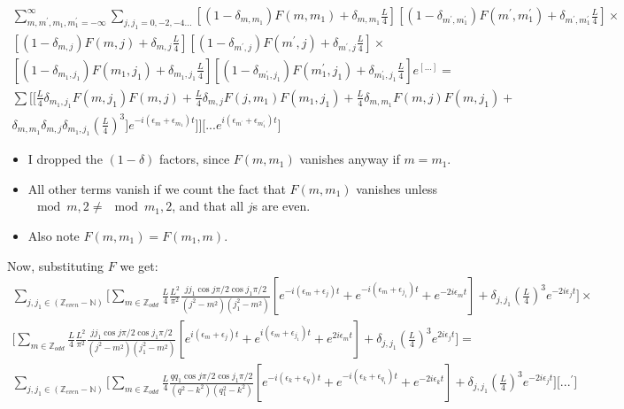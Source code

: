 \documentclass[a4paper]{article}
\begin{document}
\begin{gather*}
\sum_{m, m^\prime, m_1, m_1^\prime = -\infty}^\infty \sum_{j, j_1  = 0, -2, -4 ...} 
[(1 - \delta_{m, m_1})F(m, m_1) + \delta_{m, m_1} \frac{L}{4}] 
[(1 - \delta_{m^\prime, m^\prime_1})F(m^\prime, m^\prime_1) + \delta_{m^\prime, m^\prime_1} \frac{L}{4}] \times \\
[(1 - \delta_{m, j})F(m, j) + \delta_{m, j} \frac{L}{4}]
[(1 - \delta_{m^\prime, j})F(m^\prime, j) + \delta_{m^\prime, j} \frac{L}{4}] \times \\
[(1 - \delta_{m_1, j_1})F(m_1, j_1) + \delta_{m_1, j_1} \frac{L}{4}]
[(1 - \delta_{m^\prime_1, j_1})F(m^\prime_1, j_1) + \delta_{m^\prime_1, j_1} \frac{L}{4}] e^{[\dots]} = \\
\sum \big[[\frac{L}{4} \delta_{m_1, j_1}F(m, j_1)F(m, j) + \frac{L}{4} \delta_{m, j}F(j, m_1)F(m_1, j_1) + \frac{L}{4} \delta_{m, m_1}F(m, j)F(m, j_1) + \\
\delta_{m, m_1}\delta_{m, j}\delta_{m_1, j_1}(\frac{L}{4})^3]e^{-i(\epsilon_m + \epsilon_{m_1})t}]\big] \big[ ... e^{i(\epsilon_{m^\prime} + \epsilon_{m_1^\prime})t}\big]
\end{gather*}
\begin{itemize}
	\item I dropped the $(1 - \delta)$ factors, since $F(m, m_1)$ vanishes anyway if $m = m_1$.
	\item All other terms vanish if we count the fact that $F(m, m_1)$ vanishes unless $\mod{m ,2} \ne \mod{m_1, 2}$, and that all $j$s are even.
	\item Also note $F(m, m_1) = F(m_1, m)$.
\end{itemize}

Now, substituting $F$ we get:
\begin{gather*}
\sum_{j, j_1 \in (\mathbb{Z}_{even} - \mathbb{N})}
\big[ \sum_{m \in \mathbb{Z}_{odd}} \frac{L}{4}\frac{L^2}{\pi^2} \frac{jj_1\cos{j\pi/2}\cos{j_1\pi/2}}{(j^2 - m^2)(j_1^2 - m^2)}[e^{-i(\epsilon_m + \epsilon_j)t} + e^{-i(\epsilon_m + \epsilon_{j_1})t} + e^{-2i\epsilon_m t}] 
+ \delta_{j, j_1}(\frac{L}{4})^3 e^{-2i\epsilon_j t} 
\big] \times \\
 \big[\sum_{m \in \mathbb{Z}_{odd}} \frac{L}{4}\frac{L^2}{\pi^2} \frac{jj_1\cos{j\pi/2}\cos{j_1\pi/2}}{(j^2 - m^2)(j_1^2 - m^2)}[e^{i(\epsilon_m + \epsilon_j)t} + e^{i(\epsilon_m + \epsilon_{j_1})t} + e^{2i\epsilon_m t}] 
+ \delta_{j, j_1}(\frac{L}{4})^3 e^{2i\epsilon_j t} \big] = \\
\sum_{j, j_1 \in (\mathbb{Z}_{even} - \mathbb{N})}
\big[ \sum_{m \in \mathbb{Z}_{odd}} \frac{L}{4} \frac{qq_1\cos{j\pi/2}\cos{j_1\pi/2}}{(q^2 - k^2)(q_1^2 - k^2)}[e^{-i(\epsilon_k + \epsilon_q)t} + e^{-i(\epsilon_k + \epsilon_{q_1})t} + e^{-2i\epsilon_k t}] 
+ \delta_{j, j_1}(\frac{L}{4})^3 e^{-2i\epsilon_j t} 
\big] \big[...^\prime\big]
\end{gather*}
\end{document}
